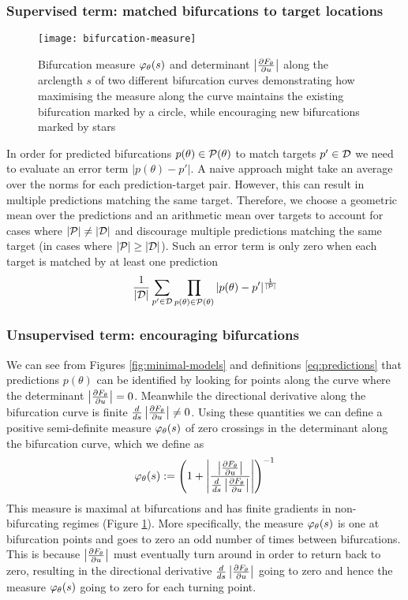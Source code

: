 \subsubsection{Supervised term: matched bifurcations to target locations}

\begin{figure}
    \centering
    \texttt{[image: bifurcation-measure]}
    \caption{Bifurcation measure $\varphi_{\theta}(s)$ and determinant $\left| \frac{\partial F_{\theta}}{\partial u} \right|$ along the arclength $s$ of two different bifurcation curves demonstrating how maximising the measure along the curve maintains the existing bifurcation marked by a circle, while encouraging new bifurcations marked by stars}
    \label{fig:measure}
\end{figure}

In order for predicted bifurcations $p(\theta)\in\mathcal{P}(\theta)$ to match targets $p'\in\mathcal{D}$ we need to evaluate an error term $|p(\theta)-p'|$. A naive approach might take an average over the norms for each prediction-target pair. However, this can result in multiple predictions matching the same target. Therefore, we choose a geometric mean over the predictions and an arithmetic mean over targets to account for cases where $|\mathcal{P}|\neq|\mathcal{D}|$ and discourage multiple predictions matching the same target (in cases where $|\mathcal{P}|\geq|\mathcal{D}|$). Such an error term is only zero when each target is matched by at least one prediction
\begin{align}
    \frac{1}{|\mathcal{D}|}\sum_{p'\in\mathcal{D}}
    \prod_{p(\theta)\in\mathcal{P}(\theta)}|p(\theta)-p'|
    ^{\frac{1}{|\mathcal{P}|}}
    \label{eq:error}
\end{align}

\subsubsection{Unsupervised term: encouraging bifurcations}

We can see from Figures \ref{fig:minimal-models} and definitions \eqref{eq:predictions} that predictions $p(\theta)$ can be identified by looking for points along the curve where the determinant $\left| \frac{\partial F_{\theta}}{\partial u} \right|=0$. Meanwhile the directional derivative along the bifurcation curve is finite $\frac{d}{ds}\left| \frac{\partial F_{\theta}}{\partial u} \right|\neq 0$. Using these quantities we can define a positive semi-definite measure $\varphi_{\theta}(s)$ of zero crossings in the determinant along the bifurcation curve, which we define as 
\begin{equation}
    \varphi_{\theta}(s):=
    \left(1+\left|\frac{\left| \frac{\partial F_{\theta}}{\partial u} \right|}{\frac{d}{ds}\left| \frac{\partial F_{\theta}}{\partial u} \right|}\right|\right)^{-1}
    \label{eq:measure}
\end{equation}
This measure is maximal at bifurcations and has finite gradients in non-bifurcating regimes (Figure \ref{fig:measure}). More specifically, the measure $\varphi_{\theta}(s)$ is one at bifurcation points and goes to zero an odd number of times between bifurcations. This is because $\left| \frac{\partial F_{\theta}}{\partial u} \right|$ must eventually turn around in order to return back to zero, resulting in the directional derivative $\frac{d}{ds}\left| \frac{\partial F_{\theta}}{\partial u} \right|$ going to zero and hence the measure $\varphi_{\theta}(s)$ going to zero for each turning point. 

